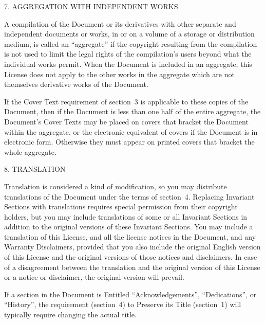 \documentclass[10pt,a4paper,final]{book}
\begin{document}
{\begin{center}
{\Large 7. AGGREGATION WITH INDEPENDENT WORKS\par}
\end{center}


A compilation of the Document or its derivatives with other separate
and independent documents or works, in or on a volume of a storage or
distribution medium, is called an ``aggregate'' if the copyright
resulting from the compilation is not used to limit the legal rights
of the compilation's users beyond what the individual works permit.
When the Document is included in an aggregate, this License does not
apply to the other works in the aggregate which are not themselves
derivative works of the Document.

If the Cover Text requirement of section~3 is applicable to these
copies of the Document, then if the Document is less than one half of
the entire aggregate, the Document's Cover Texts may be placed on
covers that bracket the Document within the aggregate, or the
electronic equivalent of covers if the Document is in electronic form.
Otherwise they must appear on printed covers that bracket the whole
aggregate.


\begin{center}
{\Large 8. TRANSLATION\par}
\end{center}


Translation is considered a kind of modification, so you may
distribute translations of the Document under the terms of section~4.
Replacing Invariant Sections with translations requires special
permission from their copyright holders, but you may include
translations of some or all Invariant Sections in addition to the
original versions of these Invariant Sections.  You may include a
translation of this License, and all the license notices in the
Document, and any Warranty Disclaimers, provided that you also include
the original English version of this License and the original versions
of those notices and disclaimers.  In case of a disagreement between
the translation and the original version of this License or a notice
or disclaimer, the original version will prevail.

If a section in the Document is Entitled ``Acknowledgements'',
``Dedications'', or ``History'', the requirement (section~4) to Preserve
its Title (section~1) will typically require changing the actual
title.


}
\end{document}
